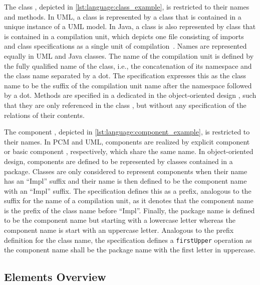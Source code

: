 The class \commonality, depicted in \autoref{lst:language:class_example}, is restricted to their names and methods.
In \gls{UML}, a class is represented by a class that is contained in a unique instance of a \gls{UML} model.
In Java, a class is also represented by class that is contained in a compilation unit, which depicts one file consisting of imports and class specifications as a single unit of compilation~\cite{heidenreich2009a}.
Names are represented equally in \gls{UML} and Java classes.
The name of the compilation unit is defined by the fully qualified name of the class, i.e., the concatenation of its namespace and the class name separated by a dot.
The specification expresses this as the class name to be the suffix of the compilation unit name after the namespace followed by a dot.
Methods are specified in a dedicated \commonality in the object-oriented design \conceptmetamodel, such that they are only referenced in the class \commonality, but without any specification of the relations of their contents.

The component \commonality, depicted in \autoref{lst:language:component_example}, is restricted to their names.
In \gls{PCM} and \gls{UML}, components are realized by explicit component or basic component \metaclasses, respectively, which share the same name.
In object-oriented design, components are defined to be represented by classes contained in a package.
Classes are only considered to represent components when their name has an \enquote{Impl} suffix and their name is then defined to be the component name with an \enquote{Impl} suffix.
The specification defines this as a prefix, analogous to the suffix for the name of a compilation unit, as it denotes that the component name is the prefix of the class name before \enquote{Impl}.
Finally, the package name is defined to be the component name but starting with a lowercase letter whereas the component name is start with an uppercase letter.
Analogous to the prefix definition for the class name, the specification defines a \texttt{firstUpper} operation as the component name shall be the package name with the first letter in uppercase.


\subsection{Elements Overview}

